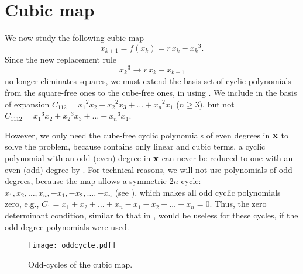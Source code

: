 \documentclass[twocolumn]{revtex4-1}
\begin{document}
\section{\label{sec:cubic}Cubic map}


We now study the following cubic map \cite{strogatz}
\begin{equation}
  x_{k + 1} = f(x_k) = r \, x_k - {x_k}^3.
\label{eq:cubic}
\end{equation}
Since the new replacement rule
\begin{equation}
  {x_k}^3 \rightarrow r \, x_k - x_{k+1}
\label{eq:cubreplace}
\end{equation}
no longer eliminates squares,
%
we must extend the basis set of cyclic polynomials
  from the square-free ones to the cube-free ones,
  in using .
We include in the basis of expansion
  $C_{112} = {x_1}^2 x_2 + {x_2}^2 x_3 + \dots + {x_n}^2 x_1$ ($n\ge3$),
but not
  $C_{1112} = {x_1}^3 x_2 + {x_2}^3 x_3 + \dots + {x_n}^3 x_1$.

%
However, we only need the cube-free cyclic polynomials of even degrees in $\mathbf{x}$
to solve the problem,
%
because  contains only linear and cubic terms,
a cyclic polynomial with an odd (even) degree in $\mathbf{x}$
can never be reduced to one with an even (odd) degree
by .
%
%
For technical reasons, we will not use polynomials of odd degrees,
because the map allows a symmetric $2n$-cycle:
$x_1, x_2, \ldots, x_n, -x_1, -x_2, \ldots, -x_n$
(see ),
which makes all odd cyclic polynomials zero,
e.g., $C_1 = x_1 + x_2 + \dots + x_n - x_1 - x_2 - \dots - x_n = 0$.
%
Thus, the zero determinant condition, similar to that in ,
  would be useless for these cycles,
  if the odd-degree polynomials were used.



\begin{figure}[h]
  \begin{minipage}{\linewidth}
    \begin{center}
        \texttt{[image: oddcycle.pdf]}
    \end{center}
  \end{minipage}%
  \caption{\label{fig:oddcycle}
  Odd-cycles of the cubic map.}
\end{figure}
\end{document}
